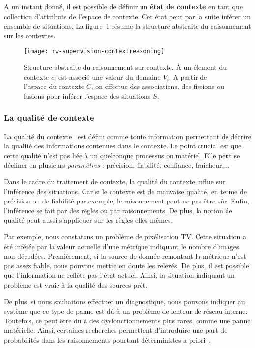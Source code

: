 A un instant donné, il est possible de définir un \textbf{état de contexte} en tant que collection d'attributs de l'espace de contexte. Cet état peut par la suite inférer un ensemble de situations. La figure~\ref{rw-supervision-contextreasoning} résume la structure abstraite du raisonnement sur les contextes.

\begin{figure}[ht]
    \centering
    \texttt{[image: rw-supervision-contextreasoning]}
    \caption{Structure abstraite du raisonnement sur contexte. À un élement du contexte $c_i$ est associé une valeur du domaine $V_i$. A partir de l'espace du contexte $C$, on effectue des associations, des fissions ou fusions pour inférer l'espace des situations $S$.}\label{rw-supervision-contextreasoning}
\end{figure}

\subsubsection{La qualité de contexte}
La qualité du contexte~\cite{Buchholz:quality} est défini comme toute information permettant de décrire la qualité des informations contenues dans le contexte. Le point crucial est que cette qualité n'est pas liée à un quelconque processus ou matériel. Elle peut se décliner en plusieurs \textit{paramètres} : précision, fiabilité, confiance, fraicheur,...

Dans le cadre du traitement de contexte, la qualité du contexte influe sur l'inférence des situations. Car si le contexte est de mauvaise qualité, en terme de précision ou de fiabilité par exemple, le raisonnement peut ne pas être sûr. Enfin, l'inférence se fait par des règles ou par raisonnements. De plus, la notion de qualité peut aussi s'appliquer sur les règles elles-mêmes.

Par exemple, nous constatons un problème de pixélisation TV. Cette situation a été inférée par la valeur actuelle d'une métrique indiquant le nombre d'images non décodées. Premièrement, si la source de donnée remontant la métrique n'est pas assez fiable, nous pouvons mettre en doute les relevés. De plus, il est possible que l'information ne reflète pas l'état actuel. Ainsi, la situation indiquant un problème est vraie à la qualité des sources prêt.

De plus, si nous souhaitons effectuer un diagnostique, nous pouvons indiquer au système que ce type de panne est dû à un problème de lenteur de réseau interne. Toutefois, ce peut être du à des dysfonctionnements plus rares, comme une panne matérielle. Ainsi, certaines recherches permettent d'introduire une part de probabilités dans les raisonnements pourtant déterministes a priori~\cite{Padovitz:agent}.

